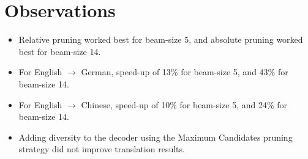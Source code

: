 \documentclass[12pt]{article}
\begin{document}
\section{Observations}
  \begin{itemize}
    \item Relative pruning worked best for beam-size 5, and absolute pruning worked best for beam-size 14.
    \item For English $\rightarrow$ German, speed-up of 13\% for beam-size 5, and 43\% for beam-size 14.
    \item For English $\rightarrow$ Chinese, speed-up of 10\% for beam-size 5, and 24\% for beam-size 14.
    \item Adding diversity to the decoder using the Maximum Candidates pruning strategy did not improve translation results.
  \end{itemize}



\end{document}
